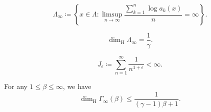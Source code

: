 \documentclass[10pt,a4paper]{amsart}
\begin{document}
        \begin{equation}\label{e.def_pi_infty}
                \Lambda_{\infty}\coloneqq
                \left\{x\in \Lambda:
                \limsup_{n\to\infty}\frac{\sum^n_{k=1}\log a_k(x)}{n}
                =\infty\right\}.
        \end{equation}

        \begin{proposition}\label{l.Hausdorff_dimension_limsup_log_pi/n}
        \begin{equation*}
                \dim_{\mathrm{H}}\Lambda_{\infty}
                =\frac{1}{\gamma}.
        \end{equation*}
\end{proposition}

        \begin{equation}\label{e.def_J_epsilon}
             J_{\epsilon} \coloneqq \sum_{n=1}^{\infty}
        \frac{1}{n^{1+\epsilon}}<\infty.
        \end{equation}

\begin{lemma}\label{l.Hausdorff_dimension_Gamma_infty} For any $1\leq \beta \leq \infty$, we have
        \begin{equation*}\label{e.upperboundGamma_infty}
\dim_{\mathrm{H}}{\Gamma}_{\infty}(\beta)
                \leq \frac{1}{(\gamma-1)\beta+1}.
        \end{equation*}
\end{lemma}
\end{document}
